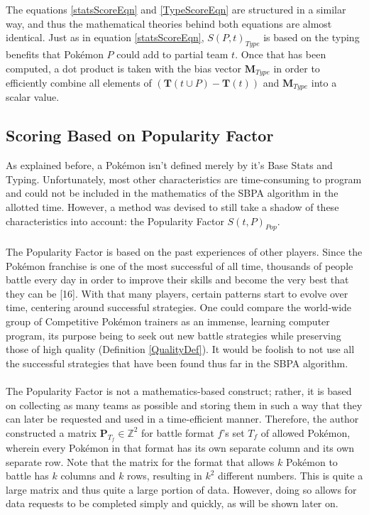 \documentclass{article}
\begin{document}
The equations \ref{statsScoreEqn} and \ref{TypeScoreEqn} are structured in a similar way, and thus the mathematical theories behind both equations are almost identical. Just as in equation \ref{statsScoreEqn}, $S(P,t)_{Type}$ is based on the typing benefits that Pok\'emon $P$ could add to partial team $t$. Once that has been computed, a dot product is taken with the bias vector $\textbf{M}_{Type}$ in order to efficiently combine all elements of $(\textbf{T}(t\cup P)-\textbf{T}(t))$ and $\textbf{M}_{Type}$ into a scalar value.

\subsection{Scoring Based on Popularity Factor}
As explained before, a Pok\'emon isn't defined merely by it's Base Stats and Typing. Unfortunately, most other characteristics are time-consuming to program and could not be included in the mathematics of the SBPA algorithm in the allotted time. However, a method was devised to still take a shadow of these characteristics into account: the Popularity Factor $S(t,P)_{Pop}$.\\\\
The Popularity Factor is based on the past experiences of other players. Since the Pok\'emon franchise is one of the most successful of all time, thousands of people battle every day in order to improve their skills and become the very best that they can be [16]. With that many players, certain patterns start to evolve over time, centering around successful strategies. One could compare the world-wide group of Competitive Pok\'emon trainers as an immense, learning computer program, its purpose being to seek out new battle strategies while preserving those of high quality (Definition \ref{QualityDef}). It would be foolish to not use all the successful strategies that have been found thus far in the SBPA algorithm.\\\\
The Popularity Factor is not a mathematics-based construct; rather, it is based on collecting as many teams as possible and storing them in such a way that they can later be requested and used in a time-efficient manner. Therefore, the author constructed a matrix $\textbf{P}_{T_f}\in\mathbb{Z}^2$ for battle format $f$'s set $T_f$ of allowed Pok\'emon, wherein every Pok\'emon in that format has its own separate column and its own separate row. Note that the matrix for the format that allows $k$ Pok\'emon to battle has $k$ columns and $k$ rows, resulting in $k^2$ different numbers. This is quite a large matrix and thus quite a large portion of data. However, doing so allows for data requests to be completed simply and quickly, as will be shown later on.\\\\
\end{document}
